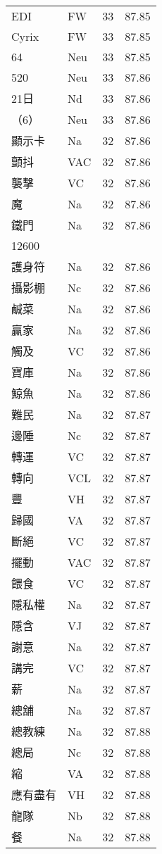 \documentclass[twocolumn]{book}
\begin{document}
\begin{supertabular}{llrr}
EDI & FW & 33 &  87.85\\
Cyrix & FW & 33 &  87.85\\
64 & Neu & 33 &  87.85\\
520 & Neu & 33 &  87.86\\
21日 & Nd & 33 &  87.86\\
（6） & Neu & 33 &  87.86\\
顯示卡 & Na & 32 &  87.86\\
顫抖 & VAC & 32 &  87.86\\
襲擊 & VC & 32 &  87.86\\
魔 & Na & 32 &  87.86\\
鐵門 & Na & 32 &  87.86\\
12600\\
護身符 & Na & 32 &  87.86\\
攝影棚 & Nc & 32 &  87.86\\
鹹菜 & Na & 32 &  87.86\\
贏家 & Na & 32 &  87.86\\
觸及 & VC & 32 &  87.86\\
寶庫 & Na & 32 &  87.86\\
鯨魚 & Na & 32 &  87.86\\
難民 & Na & 32 &  87.87\\
邊陲 & Nc & 32 &  87.87\\
轉運 & VC & 32 &  87.87\\
轉向 & VCL & 32 &  87.87\\
豐 & VH & 32 &  87.87\\
歸國 & VA & 32 &  87.87\\
斷絕 & VC & 32 &  87.87\\
擺動 & VAC & 32 &  87.87\\
餵食 & VC & 32 &  87.87\\
隱私權 & Na & 32 &  87.87\\
隱含 & VJ & 32 &  87.87\\
謝意 & Na & 32 &  87.87\\
講完 & VC & 32 &  87.87\\
薪 & Na & 32 &  87.87\\
總舖 & Na & 32 &  87.87\\
總教練 & Na & 32 &  87.88\\
總局 & Nc & 32 &  87.88\\
縮 & VA & 32 &  87.88\\
應有盡有 & VH & 32 &  87.88\\
龍隊 & Nb & 32 &  87.88\\
餐 & Na & 32 &  87.88\\

\end{supertabular}
\end{document}
